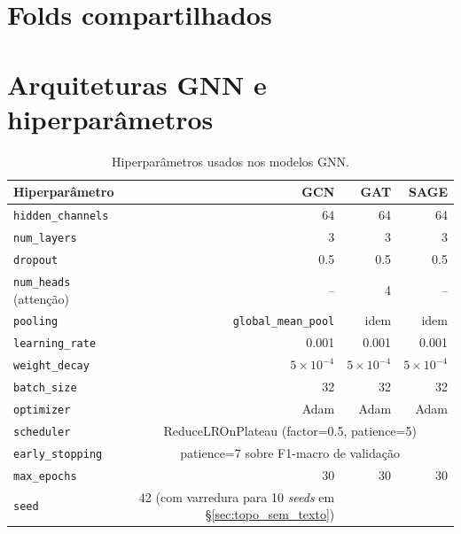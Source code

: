 \section{Folds compartilhados}
\label{sec:folds}

%

\section{Arquiteturas GNN e hiperpar\^ametros}
\label{sec:arquiteturas}

%

\begin{table}[H]\centering
\caption{Hiperpar\^ametros usados nos modelos GNN.}
\label{tab:hyperparams}
\small
\begin{tabular}{lrrr}
\toprule
\textbf{Hiperpar\^ametro} & \textbf{GCN} & \textbf{GAT} & \textbf{SAGE} \\
\midrule
\texttt{hidden\_channels}     & 64     & 64     & 64 \\
\texttt{num\_layers}          & 3      & 3      & 3 \\
\texttt{dropout}              & 0{.}5  & 0{.}5  & 0{.}5 \\
\texttt{num\_heads} (atten\c{c}\~ao) & --     & 4      & -- \\
\texttt{pooling}              & \texttt{global\_mean\_pool} & idem & idem \\
\texttt{learning\_rate}       & 0{.}001 & 0{.}001 & 0{.}001 \\
\texttt{weight\_decay}        & $5\times10^{-4}$ & $5\times10^{-4}$ & $5\times10^{-4}$ \\
\texttt{batch\_size}          & 32     & 32     & 32 \\
\texttt{optimizer}            & Adam   & Adam   & Adam \\
\texttt{scheduler}            & \multicolumn{3}{c}{ReduceLROnPlateau (factor=0{.}5, patience=5)} \\
\texttt{early\_stopping}      & \multicolumn{3}{c}{patience=7 sobre F1-macro de valida\c{c}\~ao} \\
\texttt{max\_epochs}          & 30     & 30     & 30 \\
\texttt{seed}                 & 42 (com varredura para 10 \emph{seeds} em \S\ref{sec:topo_sem_texto}) \\
\bottomrule
\end{tabular}
\end{table}

